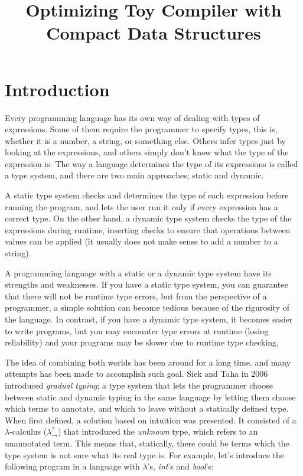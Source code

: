 \documentclass[submission]{eptcs}
\title{Optimizing Toy Compiler with Compact Data Structures}
\author{ 
\institute{Department of Computer Science\\
University of Chile\\
Santiago, Chile}
}
\begin{document}
\maketitle

\section{Introduction}

Every programming language has its own way of dealing with types of expressions.
Some of them require the programmer to specify types, this is, whether it is a number, a string, or something else.
Others infer types just by looking at the expressions, and others simply don't know what the type of the expression is.
The way a language determines the type of its expressions is called a type system, and there are two main approaches; static and dynamic.

A static type system checks and determines the type of each expression before running the program, and lets the user run it only if every expression has a correct type.
On the other hand, a dynamic type system checks the type of the expressions during runtime, inserting checks to ensure that operations between values can be applied (it usually does not make sense to add a number to a string).


A programming language with a static or a dynamic type system have its strengths and weaknesses.
If you have a static type system, you can guarantee that there will not be runtime type errors, but from the perspective of a programmer, a simple solution can become tedious because of the rigurosity of the language.
In contrast, if you have a dynamic type system, it becomes easier to write programs, but you may encounter type errors at runtime (losing reliability) and your programs may be slower due to runtime type checking.

The idea of combining both worlds has been around for a long time, and many attempts has been made to accomplish such goal.
Siek and Taha in 2006 \cite{Siek2006GradualTF} introduced \textit{gradual typing};
a type system that lets the programmer choose between static and dynamic typing in the same language by letting them choose which terms to annotate, and which to leave without a statically defined type.
When first defined, a solution based on intuition was presented.
It consisted of a $\lambda$-calculus ($\lambda^{?}_{\rightarrow}$) that introduced the \textit{unknown} type, which refers to an unannotated term.
This means that, statically, there could be terms which the type system is not sure what its real type is.
For example, let's introduce the following program in a language with $\lambda$'s, \textit{int}'s and \textit{bool}'s:
\end{document}
